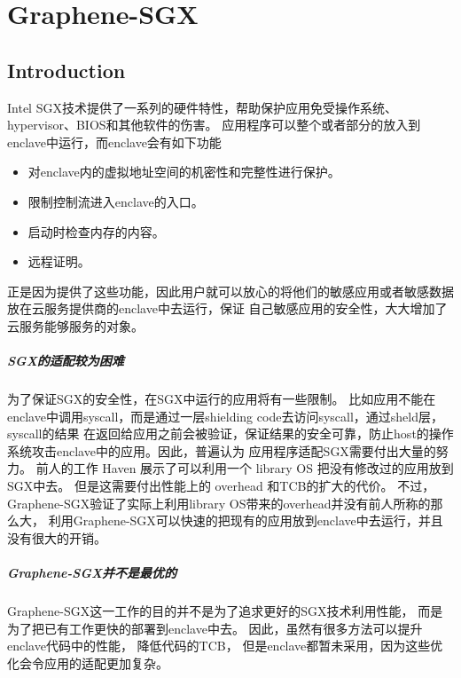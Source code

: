 
\chapter{Graphene-SGX} %

\label{Chapter3} %

\section{Introduction}
Intel SGX技术提供了一系列的硬件特性，帮助保护应用免受操作系统、hypervisor、BIOS和其他软件的伤害。
应用程序可以整个或者部分的放入到enclave中运行，而enclave会有如下功能
\begin{itemize}
    \item 对enclave内的虚拟地址空间的机密性和完整性进行保护。
    \item 限制控制流进入enclave的入口。
    \item 启动时检查内存的内容。
    \item 远程证明。
\end{itemize}

正是因为提供了这些功能，因此用户就可以放心的将他们的敏感应用或者敏感数据放在云服务提供商的enclave中去运行，保证
自己敏感应用的安全性，大大增加了云服务能够服务的对象。
\paragraph{SGX的适配较为困难}为了保证SGX的安全性，在SGX中运行的应用将有一些限制。
比如应用不能在enclave中调用syscall，而是通过一层shielding code去访问syscall，通过sheld层，syscall的结果
在返回给应用之前会被验证，保证结果的安全可靠，防止host的操作系统攻击enclave中的应用。因此，普遍认为
应用程序适配SGX需要付出大量的努力。
前人的工作 Haven \cite{Haven}展示了可以利用一个 library OS \cite{libos}把没有修改过的应用放到SGX中去。
但是这需要付出性能上的 overhead 和TCB的扩大的代价。
不过，Graphene-SGX验证了实际上利用library OS带来的overhead并没有前人所称的那么大，
利用Graphene-SGX可以快速的把现有的应用放到enclave中去运行，并且没有很大的开销。

\paragraph{Graphene-SGX并不是最优的}
Graphene-SGX这一工作的目的并不是为了追求更好的SGX技术利用性能，
而是为了把已有工作更快的部署到enclave中去。
因此，虽然有很多方法可以提升enclave代码中的性能，
降低代码的TCB，
但是enclave都暂未采用，因为这些优化会令应用的适配更加复杂。



